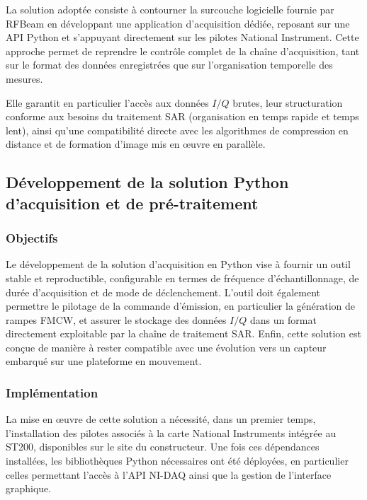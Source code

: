 La solution adoptée consiste à contourner la surcouche logicielle fournie par RFBeam en développant une application d’acquisition dédiée, reposant sur une API Python et s’appuyant directement sur les pilotes National Instrument. Cette approche permet de reprendre le contrôle complet de la chaîne d’acquisition, tant sur le format des données enregistrées que sur l’organisation temporelle des mesures.

Elle garantit en particulier l’accès aux données $I/Q$ brutes, leur structuration conforme aux besoins du traitement SAR (organisation en temps rapide et temps lent), ainsi qu’une compatibilité directe avec les algorithmes de compression en distance et de formation d’image mis en œuvre en parallèle.

\subsection{Développement de la solution Python d’acquisition et de pré-traitement}
\label{sub:ihm}

\subsubsection{Objectifs}

Le développement de la solution d’acquisition en Python vise à fournir un outil stable et reproductible, configurable en termes de fréquence d’échantillonnage, de durée d’acquisition et de mode de déclenchement. L’outil doit également permettre le pilotage de la commande d’émission, en particulier la génération de rampes FMCW, et assurer le stockage des données $I/Q$ dans un format directement exploitable par la chaîne de traitement SAR. Enfin, cette solution est conçue de manière à rester compatible avec une évolution vers un capteur embarqué sur une plateforme en mouvement.

\subsubsection{Implémentation}

La mise en œuvre de cette solution a nécessité, dans un premier temps, l’installation des pilotes associés à la carte National Instruments intégrée au ST200, disponibles sur le site du constructeur. Une fois ces dépendances installées, les bibliothèques Python nécessaires ont été déployées, en particulier celles permettant l’accès à l’API NI-DAQ ainsi que la gestion de l’interface graphique.

